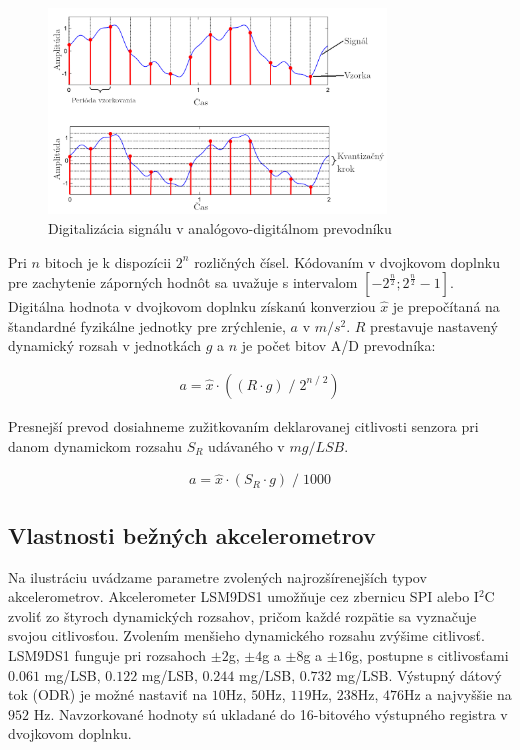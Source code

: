 \begin{figure}[h]
	\centering
	\includegraphics[width=0.8\textwidth]{figures/analysis/analog-to-digital-conversion.png}
	\caption{Digitalizácia signálu v analógovo-digitálnom prevodníku \cite{music-processing}}
\end{figure}
Pri $n$ bitoch je k dispozícii $2^n$ rozličných čísel. Kódovaním v dvojkovom doplnku pre zachytenie záporných hodnôt 
sa uvažuje s intervalom $[-2^\frac{n}{2}; 2^\frac{n}{2} - 1]$. Digitálna hodnota v dvojkovom doplnku získanú konverziou 
$\hat{x}$ je prepočítaná na štandardné fyzikálne jednotky pre zrýchlenie, $a$ v $m/s^2$. $R$ prestavuje nastavený 
dynamický rozsah v jednotkách $g$ a $n$ je počet bitov A/D prevodníka:
\begin{ceqn}\begin{align}
   a = \hat{x} \cdot ((R \cdot g)\;/\;2^{n\;/\;2})
\end{align}\end{ceqn}

Presnejší prevod dosiahneme zužitkovaním deklarovanej citlivosti senzora pri danom dynamickom rozsahu $S_R$ udávaného v $mg/LSB$.
\begin{ceqn}\begin{align}
   a = \hat{x} \cdot (S_R \cdot g)\;/\;1000
\end{align}\end{ceqn}

\subsection{Vlastnosti bežných akcelerometrov}
Na ilustráciu uvádzame parametre zvolených najrozšírenejších typov akcelerometrov. Akcelerometer LSM9DS1 \cite{lsm9ds1} umožňuje cez
zbernicu SPI alebo I$^\mathrm{2}$C zvoliť zo štyroch dynamických rozsahov, pričom každé rozpätie sa vyznačuje svojou 
citlivosťou. Zvolením menšieho
dynamického rozsahu zvýšime citlivosť. LSM9DS1 funguje pri rozsahoch $\pm2$g, $\pm4$g a $\pm8$g a $\pm16$g, postupne s citlivosťami
$0.061$ mg/LSB, $0.122$ mg/LSB, $0.244$ mg/LSB, $0.732$ mg/LSB. Výstupný dátový tok (ODR) je možné nastaviť na $10$Hz, $50$Hz,
$119$Hz, $238$Hz, $476$Hz a najvyššie na $952$ Hz. Navzorkované hodnoty sú ukladané do 16-bitového výstupného registra v
dvojkovom doplnku.


